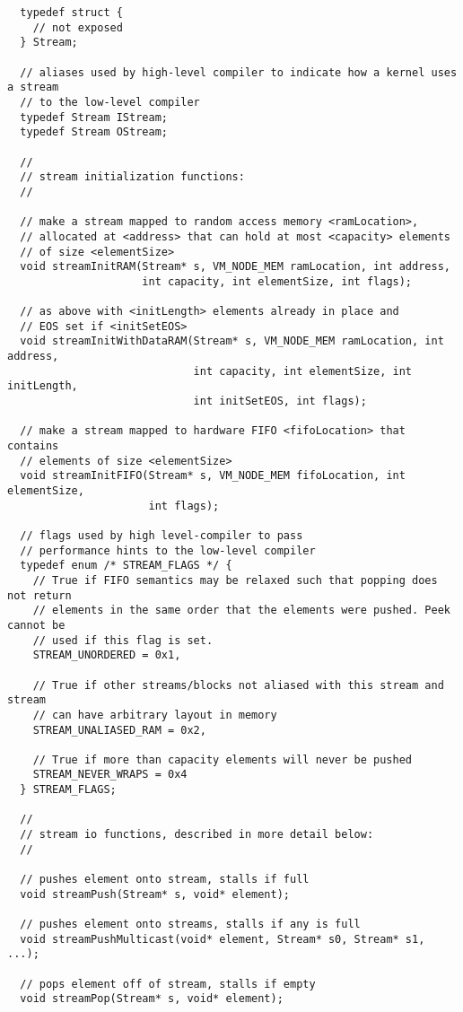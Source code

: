 {\small
\begin{verbatim}
  typedef struct {
    // not exposed
  } Stream;

  // aliases used by high-level compiler to indicate how a kernel uses a stream
  // to the low-level compiler
  typedef Stream IStream;
  typedef Stream OStream;

  //
  // stream initialization functions:
  //
  
  // make a stream mapped to random access memory <ramLocation>, 
  // allocated at <address> that can hold at most <capacity> elements
  // of size <elementSize>
  void streamInitRAM(Stream* s, VM_NODE_MEM ramLocation, int address, 
                     int capacity, int elementSize, int flags);

  // as above with <initLength> elements already in place and
  // EOS set if <initSetEOS>
  void streamInitWithDataRAM(Stream* s, VM_NODE_MEM ramLocation, int address, 
                             int capacity, int elementSize, int initLength, 
                             int initSetEOS, int flags);

  // make a stream mapped to hardware FIFO <fifoLocation> that contains
  // elements of size <elementSize>
  void streamInitFIFO(Stream* s, VM_NODE_MEM fifoLocation, int elementSize,
                      int flags);

  // flags used by high level-compiler to pass 
  // performance hints to the low-level compiler
  typedef enum /* STREAM_FLAGS */ {
    // True if FIFO semantics may be relaxed such that popping does not return   
    // elements in the same order that the elements were pushed. Peek cannot be
    // used if this flag is set.
    STREAM_UNORDERED = 0x1,

    // True if other streams/blocks not aliased with this stream and stream 
    // can have arbitrary layout in memory
    STREAM_UNALIASED_RAM = 0x2,
    
    // True if more than capacity elements will never be pushed
    STREAM_NEVER_WRAPS = 0x4
  } STREAM_FLAGS;  

  //
  // stream io functions, described in more detail below:
  //
  
  // pushes element onto stream, stalls if full
  void streamPush(Stream* s, void* element);
  
  // pushes element onto streams, stalls if any is full
  void streamPushMulticast(void* element, Stream* s0, Stream* s1, ...);
  
  // pops element off of stream, stalls if empty
  void streamPop(Stream* s, void* element);
  

\end{verbatim}}
